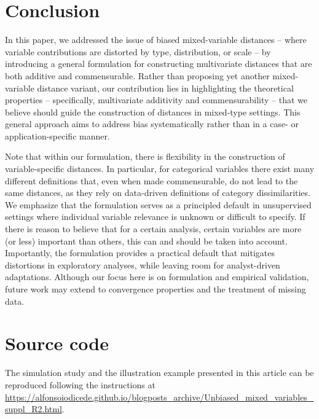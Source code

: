 \documentclass[12pt]{article}
\begin{document}
\section{Conclusion}
In this paper, we addressed the issue of biased mixed-variable distances – where variable contributions are distorted by type, distribution, or scale – by introducing a general formulation for constructing multivariate distances that are both additive and commensurable. Rather than proposing yet another mixed-variable distance variant, our contribution lies in highlighting the theoretical properties – specifically, multivariate additivity and commensurability – that we believe should guide the construction of distances in mixed-type settings. This general approach aims to address bias systematically rather than in a case- or application-specific manner.

Note that within our formulation, there is flexibility in the construction of variable-specific distances. In particular, for categorical variables there exist many different definitions that, even when made commensurable, do not lead to the same distances, as they rely on data-driven definitions of category dissimilarities. We emphasize that the formulation serves as a principled default in unsupervised settings where individual variable relevance is unknown or difficult to specify. If there is reason to believe that for a certain analysis, certain variables are more (or less) important than others, this can and should be taken into account. Importantly, the formulation provides a practical default that mitigates distortions in exploratory analyses, while leaving room for analyst-driven adaptations. Although our focus here is on formulation and empirical validation, future work may extend to convergence properties and the treatment of missing data.

\section*{Source code}
The simulation study and the illustration example presented in this article can be reproduced following the instructions at \url{https://alfonsoiodicede.github.io/blogposts_archive/Unbiased_mixed_variables_suppl_R2.html}.



\printbibliography
\end{document}
